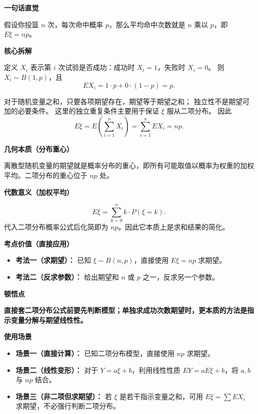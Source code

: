 \begin{explanationbox}
	\textbf{\textcolor{CExplanation}{一句话直觉}}

	假设你投篮 $n$ 次，每次命中概率 $p$，那么平均命中次数就是 $n$ 乘以 $p$，即 $E\xi=np$。

	\medskip
	\textbf{\textcolor{CExplanation}{核心拆解}}
	\begin{description}[style=nextline, leftmargin=2.8em, labelsep=0.5em, itemsep=0.45em]
		\item[\textbf{要点一（伯努利指示变量）：}]
		      定义 $X_i$ 表示第 $i$ 次试验是否成功：成功时 $X_i=1$，失败时 $X_i=0$。
		      则 $X_i\sim B(1,p)$，且
		      \[
			      EX_i=1\cdot p+0\cdot(1-p)=p.
		      \]

		\item[\textbf{要点二（期望可加）：}]
		      对于随机变量之和，只要各项期望存在，期望等于期望之和；
		      独立性不是期望可加的必要条件。
		      这里的独立重复条件主要用于保证 $\xi$ 服从二项分布。
		      因此
		      \[
			      E\xi
			      =
			      E\!\left(\sum_{i=1}^n X_i\right)
			      =
			      \sum_{i=1}^n EX_i
			      =
			      np.
		      \]
	\end{description}

	\medskip
	\textbf{\textcolor{CExplanation}{几何本质（分布重心）}}

	离散型随机变量的期望就是概率分布的重心，即所有可能取值以概率为权重的加权平均。二项分布的重心位于 $np$ 处。

	\medskip
	\textbf{\textcolor{CExplanation}{代数意义（加权平均）}}

	\[
		E\xi=\sum_{k=0}^n k\cdot P(\xi=k).
	\]
	代入二项分布概率公式后化简即为 $np$。因此它本质上是求和结果的简化。

	\medskip
	\textbf{\textcolor{CExplanation}{考点价值（直接应用）}}
	\begin{itemize}[leftmargin=*, itemsep=0.5em, topsep=0.4em]
		\item \textbf{考法一（求期望）：} 已知 $\xi\sim B(n,p)$，直接使用 $E\xi=np$ 求期望。
		\item \textbf{考法二（反求参数）：} 给出期望和 $n$ 或 $p$ 之一，反求另一个参数。
	\end{itemize}

	\medskip
	\textbf{\textcolor{CExplanation}{顿悟点}}

	\textbf{直接套二项分布公式前要先判断模型；单独求成功次数期望时，更本质的方法是指示变量分解与期望线性性。}

	\medskip
	\textbf{\textcolor{CExplanation}{使用场景}}
	\begin{itemize}[leftmargin=*, itemsep=0.5em, topsep=0.4em]
		\item \textbf{场景一（直接计算）：} 已知二项分布模型，直接使用 $np$ 求期望。
		\item \textbf{场景二（线性变形）：} 对于 $Y=a\xi+b$，利用线性性质 $EY=aE\xi+b$，将 $a,b$ 与 $np$ 结合。
		\item \textbf{场景三（非二项但求期望）：} 若 $\xi$ 是若干指示变量之和，可用 $E\xi=\sum EX_i$ 求期望，不必强行判断二项分布。
	\end{itemize}
\end{explanationbox}